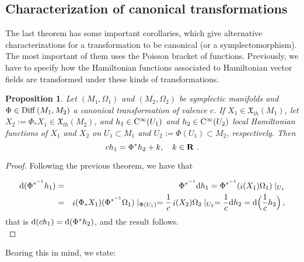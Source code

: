 \documentclass[12pt]{report}
\newtheorem{prop}[teor]{Proposition}
\def\qed{\ifvmode\removelastskip\fi
{\unskip\nobreak\hfil\penalty50\hbox{}\nobreak\hfil
\hbox{\vrule height1.2ex width1.2ex}\parfillskip=0pt
\finalhyphendemerits=0 \par\smallskip}}
\def\vf{\mathfrak X}
\def\d{{\rm d}}
\def\inn{\mathop{i}\nolimits}
\def\Cinfty{{\rm C}^\infty}
\begin{document}
\subsection{Characterization of canonical transformations}


The last theorem has some important corollaries, which give
alternative characterizations for a transformation to be canonical
(or a symplectomorphism).
The most important of them uses the Poisson bracket of functions.
Previously, we have to specify how the Hamiltonian functions associated to
Hamiltonian vector fields are transformed under 
these kinds of transformations.

\begin{prop}
Let $(M_1,\Omega_1)$ and $(M_2,\Omega_2)$ be
symplectic manifolds  
and $\Phi \in {\rm Diff}\,  (M_1,M_2)$
a canonical transformation of valence $c$.
If $X_1 \in \vf_{lh}(M_1)$, let $X_2 := \Phi_*X_1 \in \vf_{lh}(M_2)$,
and $h_1 \in \Cinfty (U_1)$ and $h_2 \in \Cinfty (U_2)$
local Hamiltonian functions of $X_1$ and $X_2$
on $U_1 \subset M_1$ and $U_2 :=\Phi (U_1) \subset M_2$,
respectively. Then
$$
ch_1 = \Phi^*h_2 + k ,\quad k \in {\bf R} \ .
$$
\end{prop}
\begin{proof}
Following the previous theorem, we have that

\begin{eqnarray*}
\d(\Phi^{*^{-1}}h_{1})&=&\Phi^{*^{-1}}\d h_{1} =\Phi^{*^{-1}}(\inn (X_1)\Omega_1)\mid_{U_1} \\&=&
\inn (\Phi_*X_1)(\Phi^{*^{-1}}\Omega_1)\mid_{\Phi (U_1)} =
\frac{1}{c}\inn (X_2)\Omega_2\mid_{U_2} =
\frac{1}{c}\d h_2 =\d\Big( \frac{1}{c}h_2\Big)  \,  ,
\end{eqnarray*}
that is
$\d(ch_{1})=\d(\Phi^{*} h_2)$, and the result follows.
\\ \qed  \end{proof}


Bearing this in mind, we state:
\end{document}
